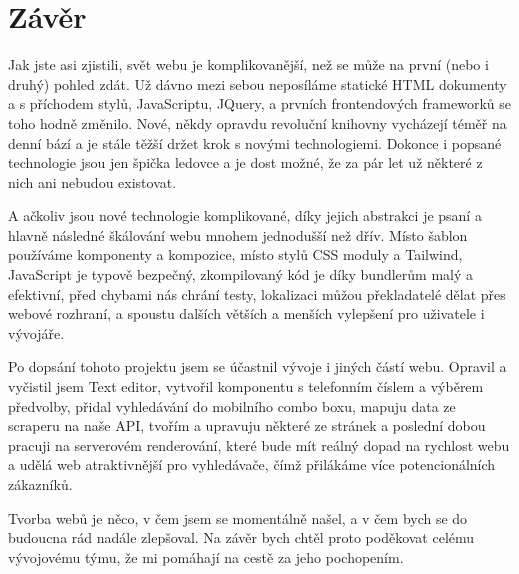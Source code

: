 \chapter*{Závěr}

Jak jste asi zjistili, svět webu je komplikovanější, než se může na první (nebo i druhý) pohled zdát. Už dávno mezi sebou neposíláme statické HTML dokumenty a s příchodem stylů, JavaScriptu, JQuery, a prvních frontendových frameworků se toho hodně změnilo. Nové, někdy opravdu revoluční knihovny vycházejí téměř na denní bází a je stále těžší držet krok s novými technologiemi. Dokonce i popsané technologie jsou jen špička ledovce a je dost možné, že za pár let už některé z nich ani nebudou existovat.

A ačkoliv jsou nové technologie komplikované, díky jejich abstrakci je psaní a hlavně následné škálování webu mnohem jednodušší než dřív. Místo šablon používáme komponenty a kompozice, místo stylů CSS moduly a Tailwind, JavaScript je typově bezpečný, zkompilovaný kód je díky bundlerům malý a efektivní, před chybami nás chrání testy, lokalizaci můžou překladatelé dělat přes webové rozhraní, a spoustu dalších větších a menších vylepšení pro uživatele i vývojáře.

Po dopsání tohoto projektu jsem se účastnil vývoje i jiných částí webu. Opravil a vyčistil jsem Text editor, vytvořil komponentu s telefonním číslem a výběrem předvolby, přidal vyhledávání do mobilního combo boxu, mapuju data ze scraperu na naše API, tvořím a upravuju některé ze stránek a poslední dobou pracuji na serverovém renderování, které bude mít reálný dopad na rychlost webu a udělá web atraktivnější pro vyhledávače, čímž přilákáme více potencionálních zákazníků.

Tvorba webů je něco, v čem jsem se momentálně našel, a v čem bych se do budoucna rád nadále zlepšoval. Na závěr bych chtěl proto poděkovat celému vývojovému týmu, že mi pomáhají na cestě za jeho pochopením.